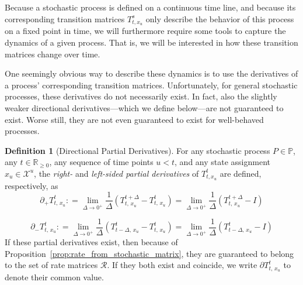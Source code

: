 \documentclass[10pt]{paper}
\theoremstyle{definition}
\newtheorem{definition}{Definition}
\newcommand{\reals}{\mathbb{R}}
\newcommand{\realsnonneg}{\reals_{\geq 0}}
\newcommand{\states}{\mathcal{X}}
\newcommand{\processes}{\mathbb{P}}
\newcommand{\coloneqq}{:\!=}
\begin{document}
Because a stochastic process is defined on a continuous time line, and because its corresponding transition matrices $T_{t,x_u}^s$ only describe the behavior of this process on a fixed point in time, we will furthermore require some tools to capture the dynamics of a given process. That is, we will be interested in how these transition matrices change over time.

One seemingly obvious way to describe these dynamics is to use the derivatives of a process' corresponding transition matrices. Unfortunately, for general stochastic processes, these derivatives do not necessarily exist. In fact, also the slightly weaker directional derivatives---which we define below---are not guaranteed to exist. Worse still, they are not even guaranteed to exist for well-behaved processes.

\begin{definition}[Directional Partial Derivatives]\label{def:direc_partial_deriv}
For any stochastic process $P\in\processes$, any $t\in\realsnonneg$, any sequence of time points $u<t$, and any state assignment $x_u\in\states^u$, the \emph{right-} and \emph{left-sided partial derivatives} of $T_{t,x_u}^t$ are defined, respectively, as
\begin{equation*}
\partial_{+}{T_{t,\,x_u}^t}
\coloneqq
\lim_{\Delta\to 0^{+}}
\frac{1}{\Delta}
(T^{t+\Delta}_{t,\,x_u}-T^t_{t,\,x_u})
=
\lim_{\Delta\to 0^{+}}
\frac{1}{\Delta}
(T^{t+\Delta}_{t,\,x_u}-I)
\end{equation*}

\begin{equation*}
\partial_{-}{T_{t,\,x_u}^t}
\coloneqq
\lim_{\Delta\to 0^{+}}
\frac{1}{\Delta}
(T^{t}_{t-\Delta,\,x_u}-T^t_{t,\,x_u})
=
\lim_{\Delta\to 0^{+}}
\frac{1}{\Delta}
(T^{t}_{t-\Delta,\,x_u}-I)
\end{equation*}
\noindent If these partial derivatives exist, then because of Proposition~\ref{prop:rate_from_stochastic_matrix}, they are guaranteed to belong to the set of rate matrices  $\mathcal{R}$. If they both exist and coincide, we write $\partial{T_{t,\,x_u}^t}$ to denote their common value.
\end{definition}
\end{document}

